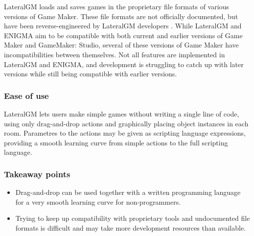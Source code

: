 LateralGM loads and saves games in the proprietary file formats of various 
versions of Game Maker. These file formats are not officially documented, but 
have been reverse-engineered by LateralGM developers \cite{lgmformats}. While 
LateralGM and ENIGMA aim to be compatible with both current and earlier 
versions of Game Maker and GameMaker: Studio, several of these versions of 
Game Maker have incompatibilities between themselves. Not all features are 
implemented in LateralGM and ENIGMA, and development is struggling to catch up 
with later versions while still being compatible with earlier versions.

\subsubsection{Ease of use}
LateralGM lets users make simple games without writing a single line of code, 
using only drag-and-drop actions and graphically placing object instances in 
each room. Parametres to the actions may be given as scripting language 
expressions, providing a smooth learning curve from simple actions to the full 
scripting language.

\subsubsection{Takeaway points}

\begin{itemize}
\item Drag-and-drop can be used together with a written programming language 
    for a very smooth learning curve for non-programmers.
\item Trying to keep up compatibility with proprietary tools and undocumented 
    file formats is difficult and may take more development resources than 
    available.
\end{itemize}
